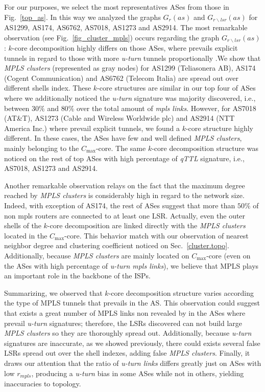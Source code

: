 For our purposes, we select the most representatives ASes from those in
Fig.~\ref{top_as}. In this way we analyzed the graphs $G_{r}(as)$ and
$G_{r\backslash lsr}(as)$ for AS1299, AS174, AS6762, AS7018, AS1273 and AS2914.
The most remarkable observation (see Fig.~\ref{fig_cluster_mpls}) occurs
regarding the graph $G_{r\backslash lsr}(as)$: $k$-core decomposition highly
differs on those ASes, where prevails explicit tunnels in regard to those with
more \textit{u-turn} tunnels proportionally .We show that \textit{MPLS clusters}
(represented as gray nodes) for  AS1299 (Teliasonera AB), AS174 (Cogent
Communication) and AS6762 (Telecom Italia) are spread out over different shells
index. These $k$-core structures are similar in our top four of ASes where we
additionally noticed  the \textit{u-turn} signature was majority discovered,
i.e., between $30\%$ and  $80\%$ over  the total amount of \textit{mpls links}.
However, for AS7018 (AT\&T), AS1273 (Cable and Wireless Worldwide plc) and
AS2914 (NTT America Inc.)  where prevail explicit tunnels, we found a $k$-core
structure highly different. In these cases,  the ASes have few and well defined
\textit{MPLS clusters}, mainly belonging to the $C_{\max}$-core.
The same $k$-core decomposition structure was noticed  on the rest of top ASes
with high percentage of \textit{qTTL} signature, i.e., AS7018, AS1273 and
AS2914.

Another remarkable observation  relays on the fact that the maximum degree
reached by \textit{MPLS clusters} is considerably high in regard to the network
size. Indeed, with exception of AS174, the rest of ASes suggest that more than
$50\%$ of non mpls routers are connected  to at least one LSR. Actually, even
the outer shells of the $k$-core decomposition are linked directly with the
\textit{MPLS clusters} located in the $C_{\max}$-core. This behavior match with
our observation of nearest neighbor degree and clustering coefficient noticed on
Sec.~\ref{cluster.topo}. Additionally, because \textit{MPLS clusters} are
mainly located on $C_{\max}$-core (even on the ASes with high percentage of
\textit{u-turn mpls links}), we believe that MPLS plays an important role in the
backbone of the ISPs.

Summarizing, we observed that  $k$-core decomposition structure varies according
the type of MPLS tunnels that prevails in the AS. This observation could suggest
that exists a great number of MPLS links non revealed by \traceroute in the ASes
where prevail \textit{u-turn} signatures; therefore, the LSRs discovered can not
build large \textit{MPLS clusters} so they are thoroughly spread out.
Additionally, because \textit{u-turn} signatures are inaccurate, as we showed
previously, there could exists several false LSRs spread out over the shell
indexes, adding false \textit{MPLS clusters}. Finally, it draws our attention
that the ratio of \textit{u-turn links} differs greatly just on ASes with low
$r_{mpls}$, producing a \textit{u-turn} bias in some ASes while not in others,
yielding inaccuracies to topology.


